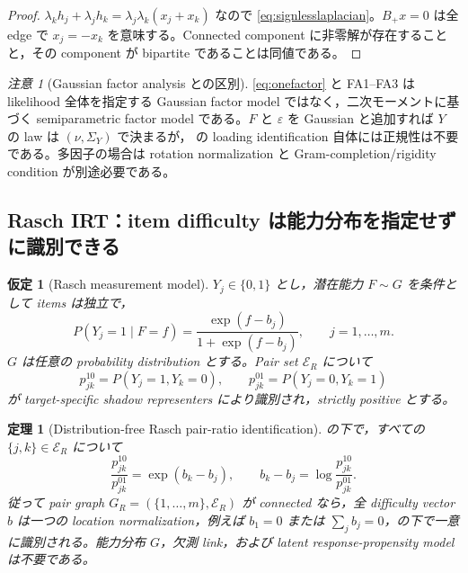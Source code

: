 \documentclass[11pt,a4paper]{ltjsarticle}
\newtheorem{assumption}{仮定}[section]
\newtheorem{theorem}{定理}[section]
\theoremstyle{remark}
\newtheorem{remark}{注意}[section]
\newcommand{\cE}{\mathcal E}
\begin{document}
\begin{proof}
$\lambda_kh_j+\lambda_jh_k=\lambda_j\lambda_k(x_j+x_k)$ なので \eqref{eq:signlesslaplacian}。$B_+x=0$ は全 edge で $x_j=-x_k$ を意味する。Connected component に非零解が存在することと，その component が bipartite であることは同値である。
\end{proof}

\begin{remark}[Gaussian factor analysis との区別]
\eqref{eq:onefactor} と FA1--FA3 は likelihood 全体を指定する Gaussian factor model ではなく，二次モーメントに基づく semiparametric factor model である。$F$ と $\varepsilon$ を Gaussian と追加すれば $Y$ の law は $(\nu,\Sigma_Y)$ で決まるが， の loading identification 自体には正規性は不要である。多因子の場合は rotation normalization と Gram-completion/rigidity condition が別途必要である。
\end{remark}

\subsection{Rasch IRT：item difficulty は能力分布を指定せずに識別できる}

\begin{assumption}[Rasch measurement model]\label{as:rasch}
$Y_j\in\{0,1\}$ とし，潜在能力 $F\sim G$ を条件として items は独立で，
\begin{equation}
P(Y_j=1\mid F=f)
=\frac{\exp(f-b_j)}{1+\exp(f-b_j)},
\qquad j=1,\ldots,m.
\label{eq:rasch}
\end{equation}
$G$ は任意の probability distribution とする。Pair set $\cE_R$ について
\[
p_{jk}^{10}=P(Y_j=1,Y_k=0),
\qquad
p_{jk}^{01}=P(Y_j=0,Y_k=1)
\]
が target-specific shadow representers により識別され，strictly positive とする。
\end{assumption}

\begin{theorem}[Distribution-free Rasch pair-ratio identification]\label{thm:raschpair}
 の下で，すべての $\{j,k\}\in\cE_R$ について
\begin{equation}
\frac{p_{jk}^{10}}{p_{jk}^{01}}
=\exp(b_k-b_j),
\qquad
b_k-b_j=\log\frac{p_{jk}^{10}}{p_{jk}^{01}}.
\label{eq:raschratio}
\end{equation}
従って pair graph $G_R=(\{1,\ldots,m\},\cE_R)$ が connected なら，全 difficulty vector $b$ は一つの location normalization，例えば $b_1=0$ または $\sum_jb_j=0$，の下で一意に識別される。能力分布 $G$，欠測 link，および latent response-propensity model は不要である。
\end{theorem}
\end{document}

